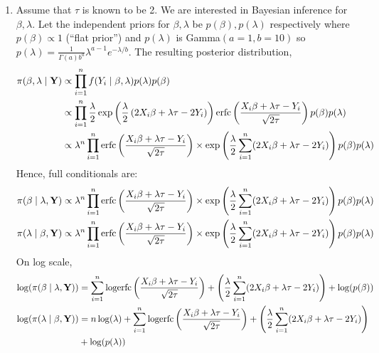 \documentclass[12pt]{article}
\newcommand{\bY}{{\bf Y}}
\theoremstyle{example}
\theoremstyle{remark}
\theoremstyle{lemma}
\theoremstyle{definition}
\theoremstyle{corol}
\theoremstyle{proposition}
\theoremstyle{condition}
\begin{document}
\begin{enumerate}
\item Assume that $\tau$ is known to be 2. We are interested in Bayesian inference 
for $\beta, \lambda$. Let the independent priors for 
$\beta, \lambda$ be $p(\beta), p(\lambda)$
respectively where $p(\beta)\propto 1$  (``flat prior'') and
$p(\lambda)$ is Gamma$(a=1,b=10)$ so $p(\lambda) = \frac{1}{\Gamma(a)
  b^a} \lambda^{a-1} e^{-\lambda/b}$. The resulting posterior
distribution, 
\begin{equation*}
\begin{split}
\pi(\beta,\lambda\mid \bY) & \propto \prod_{i=1}^n f(Y_i\mid \beta,
\lambda) p(\lambda) p(\beta) \\ %
& \propto \prod_{i=1}^n \frac{\lambda}{2}
\exp\left(\frac{\lambda}{2}\left(2X_i\beta + \lambda\tau - 2Y_i 
  \right)\right)\mbox{erfc}\left(\frac{X_i\beta + \lambda\tau -
      Y_i}{\sqrt{2\tau}} \right) p(\beta) p(\lambda) \\%
& \propto \lambda^n\prod_{i=1}^n \mbox{erfc}\left(\frac{X_i\beta + \lambda\tau -
  Y_i}{\sqrt{2\tau}}\right)  \times\exp\left( \frac{\lambda}{2}\sum_{i=1}^n 
  (2X_i\beta + \lambda\tau - 2Y_i) \right)p(\beta)p(\lambda)%
\end{split}
\end{equation*}
Hence, full conditionals are: 
\begin{equation*}
\begin{split}
\pi(\beta\mid \lambda, \bY) & \propto \lambda^n\prod_{i=1}^n \mbox{erfc}\left(\frac{X_i\beta + \lambda\tau -
  Y_i}{\sqrt{2\tau}}\right)  \times\exp\left( \frac{\lambda}{2}\sum_{i=1}^n 
  (2X_i\beta + \lambda\tau - 2Y_i) \right)p(\beta)p(\lambda)\\%
\pi(\lambda\mid \beta, \bY) & \propto \lambda^n\prod_{i=1}^n \mbox{erfc}\left(\frac{X_i\beta + \lambda\tau -
  Y_i}{\sqrt{2\tau}}\right)  \times\exp\left( \frac{\lambda}{2}\sum_{i=1}^n 
  (2X_i\beta + \lambda\tau - 2Y_i) \right)p(\beta)p(\lambda)%
\end{split}
\end{equation*}
On log scale, 
\begin{equation*}
\begin{split}
\log(\pi(\beta\mid \lambda, \bY)) & =\sum_{i=1}^n \mbox{logerfc}\left(\frac{X_i\beta + \lambda\tau -
  Y_i}{\sqrt{2\tau}}\right) + \left( \frac{\lambda}{2}\sum_{i=1}^n 
  (2X_i\beta + \lambda\tau - 2Y_i) \right) + \log(p(\beta))\\%
\log(\pi(\lambda\mid \beta, \bY)) & = n\log(\lambda) + \sum_{i=1}^n \mbox{logerfc}\left(\frac{X_i\beta + \lambda\tau -
  Y_i}{\sqrt{2\tau}}\right) + \left( \frac{\lambda}{2}\sum_{i=1}^n 
  (2X_i\beta + \lambda\tau - 2Y_i) \right) \\
& + \log(p(\lambda))%
\end{split}
\end{equation*}


\end{enumerate}
\end{document}
